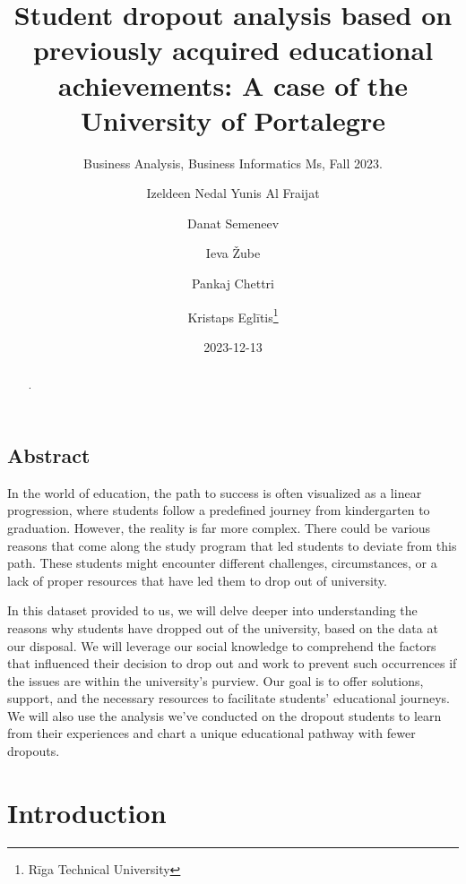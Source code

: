 \documentclass[
  letterpaper,
  DIV=11,
  numbers=noendperiod]{scrartcl}
\title{Student dropout analysis based on previously acquired educational
achievements: A case of the University of Portalegre}
\subtitle{Business Analysis, Business Informatics Ms, Fall 2023.}
\author{Izeldeen Nedal Yunis Al Fraijat \and Danat Semeneev \and Ieva
Žube \and Pankaj Chettri \and Kristaps Eglītis\footnote{Rīga Technical
  University}}
\date{2023-12-13}
\begin{document}
\maketitle
\begin{abstract}
.
\end{abstract}
\ifdefined\Shaded\renewenvironment{Shaded}{\begin{tcolorbox}[breakable, borderline west={3pt}{0pt}{shadecolor}, boxrule=0pt, interior hidden, sharp corners, enhanced, frame hidden]}{\end{tcolorbox}}\fi

\hypertarget{abstract}{%
\subsection{Abstract}\label{abstract}}

In the world of education, the path to success is often visualized as a
linear progression, where students follow a predefined journey from
kindergarten to graduation. However, the reality is far more complex.
There could be various reasons that come along the study program that
led students to deviate from this path. These students might encounter
different challenges, circumstances, or a lack of proper resources that
have led them to drop out of university.

In this dataset provided to us, we will delve deeper into understanding
the reasons why students have dropped out of the university, based on
the data at our disposal. We will leverage our social knowledge to
comprehend the factors that influenced their decision to drop out and
work to prevent such occurrences if the issues are within the
university's purview. Our goal is to offer solutions, support, and the
necessary resources to facilitate students' educational journeys. We
will also use the analysis we've conducted on the dropout students to
learn from their experiences and chart a unique educational pathway with
fewer dropouts.

\hypertarget{introduction}{%
\section{Introduction}\label{introduction}}
\end{document}
